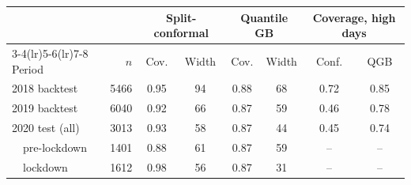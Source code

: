 \begin{tabular}{lrcccccc}
\toprule
 & & \multicolumn{2}{c}{Split-conformal} & \multicolumn{2}{c}{Quantile GB} & \multicolumn{2}{c}{Coverage, high days} \\
\cmidrule(lr){3-4}\cmidrule(lr){5-6}\cmidrule(lr){7-8}
Period & $n$ & Cov. & Width & Cov. & Width & Conf. & QGB \\
\midrule
2018 backtest & 5466 & 0.95 & 94 & 0.88 & 68 & 0.72 & 0.85 \\
2019 backtest & 6040 & 0.92 & 66 & 0.87 & 59 & 0.46 & 0.78 \\
2020 test (all) & 3013 & 0.93 & 58 & 0.87 & 44 & 0.45 & 0.74 \\
\ \ pre-lockdown & 1401 & 0.88 & 61 & 0.87 & 59 & -- & -- \\
\ \ lockdown & 1612 & 0.98 & 56 & 0.87 & 31 & -- & -- \\
\bottomrule
\end{tabular}
